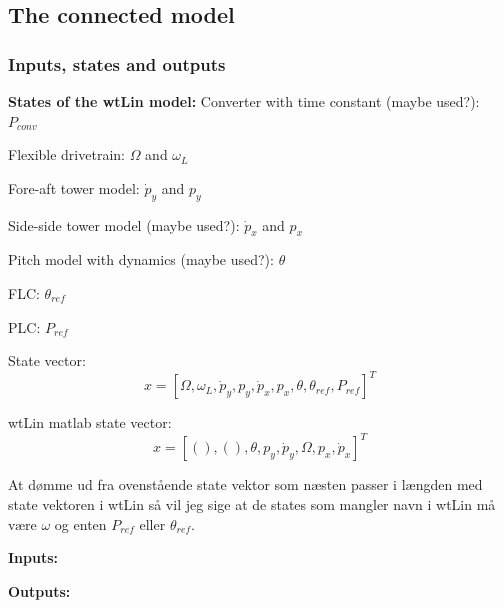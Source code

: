 %	

\subsection{The connected model}

\subsubsection{Inputs, states and outputs}
\textbf{States of the wtLin model:}
Converter with time constant (maybe used?): $ P_{conv} $

Flexible drivetrain: $ \Omega $ and $ \omega_L $

Fore-aft tower model: $ \dot{p}_y $ and $ p_y $

Side-side tower model (maybe used?): $ \dot{p}_x $ and $ p_x $

Pitch model with dynamics (maybe used?): $ \theta $

FLC: $ \theta_{ref} $

PLC: $ P_{ref} $

State vector: 
\begin{equation}\label{key}
	x = [\Omega, \omega_L, \dot{p}_y, p_y, \dot{p}_x, p_x, \theta, \theta_{ref}, P_{ref}]^T
\end{equation}

wtLin matlab state vector:
\begin{equation}\label{key}
	x = [(), (), \theta, p_y, \dot{p}_y, \Omega, p_x, \dot{p}_x]^T
\end{equation}

At dømme ud fra ovenstående state vektor som næsten passer i længden med state vektoren i wtLin så vil jeg sige at de states som mangler navn i wtLin må være $ \omega $ og enten $ P_{ref} $ eller $ \theta_{ref} $.

\textbf{Inputs:}


\textbf{Outputs:}
